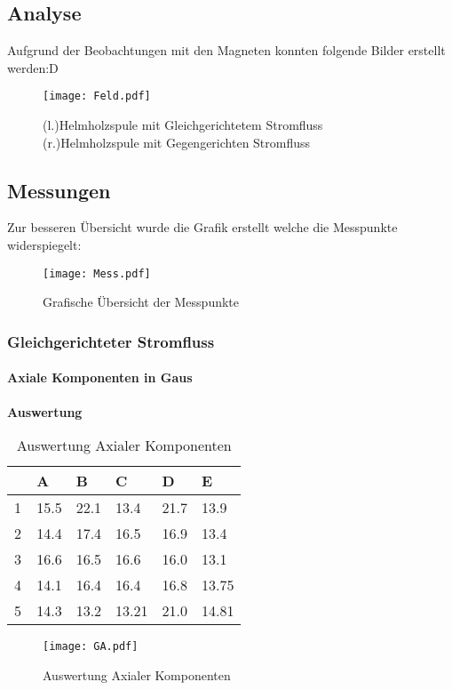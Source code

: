 \documentclass{article}
\begin{document}
\subsection{Analyse}
Aufgrund der Beobachtungen mit den Magneten konnten folgende Bilder erstellt werden:D
\begin{figure}[H]
	
	\texttt{[image: Feld.pdf]} 
	\caption{(l.)Helmholzspule mit Gleichgerichtetem Stromfluss (r.)Helmholzspule mit Gegengerichten Stromfluss}
\end{figure}
\subsection{Messungen}
\newpage
Zur besseren Übersicht wurde die Grafik erstellt welche die Messpunkte widerspiegelt:
\begin{figure}[H]
	
	\texttt{[image: Mess.pdf]} 
	\caption{Grafische Übersicht der Messpunkte}
\end{figure}
\newpage
\subsubsection{Gleichgerichteter Stromfluss}
\paragraph{Axiale Komponenten in Gaus}
\textbf{Auswertung}
\begin{table}[H]
	\centering
	\begin{tabular}{|l|l|l|l|l|l|}
		\hline
		~ & A     & B    & C     & D    & E     \\ \hline
		1 & 15.5  & 22.1 & 13.4  & 21.7 & 13.9  \\ 
		2 & 14.4  & 17.4 & 16.5  & 16.9 & 13.4  \\ 
		3 & 16.6  & 16.5 & 16.6  & 16.0 & 13.1  \\ 
		4 & 14.1  & 16.4 & 16.4  & 16.8 & 13.75 \\ 
		5 & 14.3  & 13.2 & 13.21 & 21.0 & 14.81 \\
		\hline
	\end{tabular}
\begin{figure}[H]
	\centering
	\texttt{[image: GA.pdf]} 
	\caption{Auswertung Axialer Komponenten}
\end{figure}
\end{table}
\newpage
\end{document}
